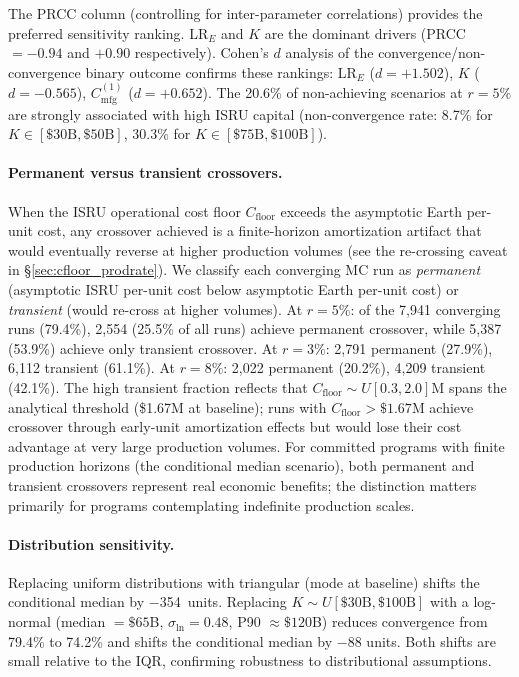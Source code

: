 \documentclass[preprint,12pt]{elsarticle}
\begin{document}
The PRCC column (controlling for inter-parameter correlations) provides the preferred sensitivity ranking. LR$_E$ and $K$ are the dominant drivers (PRCC $= -0.94$ and $+0.90$ respectively). Cohen's $d$ analysis of the convergence/non-convergence binary outcome confirms these rankings: LR$_E$ ($d = +1.502$), $K$ ($d = -0.565$), $C_{\mathrm{mfg}}^{(1)}$ ($d = +0.652$). The 20.6\% of non-achieving scenarios at $r = 5\%$ are strongly associated with high ISRU capital (non-convergence rate: 8.7\% for $K \in [\$30\text{B}, \$50\text{B}]$, 30.3\% for $K \in [\$75\text{B}, \$100\text{B}]$).

\paragraph{Permanent versus transient crossovers.} When the ISRU operational cost floor $C_{\mathrm{floor}}$ exceeds the asymptotic Earth per-unit cost, any crossover achieved is a finite-horizon amortization artifact that would eventually reverse at higher production volumes (see the re-crossing caveat in \S\ref{sec:cfloor_prodrate}). We classify each converging MC run as \emph{permanent} (asymptotic ISRU per-unit cost below asymptotic Earth per-unit cost) or \emph{transient} (would re-cross at higher volumes). At $r = 5\%$: of the 7{,}941 converging runs (79.4\%), 2{,}554 (25.5\% of all runs) achieve permanent crossover, while 5{,}387 (53.9\%) achieve only transient crossover. At $r = 3\%$: 2{,}791 permanent (27.9\%), 6{,}112 transient (61.1\%). At $r = 8\%$: 2{,}022 permanent (20.2\%), 4{,}209 transient (42.1\%). The high transient fraction reflects that $C_{\mathrm{floor}} \sim U[0.3, 2.0]$M spans the analytical threshold (\$1.67M at baseline); runs with $C_{\mathrm{floor}} > \$1.67$M achieve crossover through early-unit amortization effects but would lose their cost advantage at very large production volumes. For committed programs with finite production horizons (the conditional median scenario), both permanent and transient crossovers represent real economic benefits; the distinction matters primarily for programs contemplating indefinite production scales.

\paragraph{Distribution sensitivity.} Replacing uniform distributions with triangular (mode at baseline) shifts the conditional median by $-$354~units. Replacing $K \sim U[\$30\text{B}, \$100\text{B}]$ with a log-normal (median $= \$65$B, $\sigma_{\ln} = 0.48$, P90 $\approx \$120$B) reduces convergence from 79.4\% to 74.2\% and shifts the conditional median by $-$88 units. Both shifts are small relative to the IQR, confirming robustness to distributional assumptions.
\end{document}
